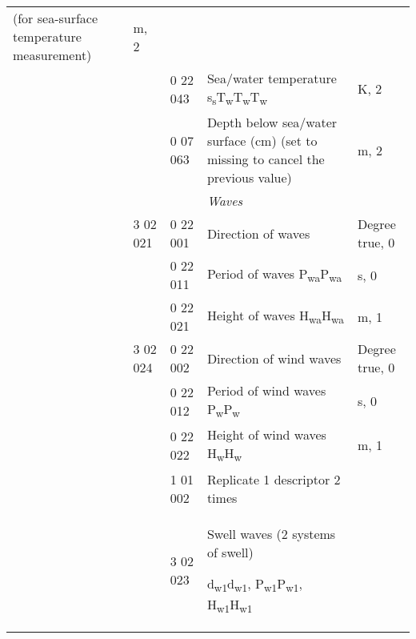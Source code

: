 \begin{longtable}[]{@{}lllll@{}}
\begin{minipage}[t]{0.17\columnwidth}
(for sea-surface temperature measurement)\strut
\end{minipage} & \begin{minipage}[t]{0.17\columnwidth}\raggedright
m, 2\strut
\end{minipage}\tabularnewline
& & 0 22 043 & Sea/water temperature s\textsubscript{s}T\textsubscript{w}T\textsubscript{w}T\textsubscript{w} & K, 2\tabularnewline
& & 0 07 063 & Depth below sea/water surface (cm) (set to missing to cancel the previous value) & m, 2\tabularnewline
& & & \emph{Waves} &\tabularnewline
& 3 02 021 & 0 22 001 & Direction of waves & Degree true, 0\tabularnewline
& & 0 22 011 & Period of waves P\textsubscript{wa}P\textsubscript{wa} & s, 0\tabularnewline
& & 0 22 021 & Height of waves H\textsubscript{wa}H\textsubscript{wa} & m, 1\tabularnewline
& 3 02 024 & 0 22 002 & Direction of wind waves & Degree true, 0\tabularnewline
& & 0 22 012 & Period of wind waves P\textsubscript{w}P\textsubscript{w} & s, 0\tabularnewline
& & 0 22 022 & Height of wind waves H\textsubscript{w}H\textsubscript{w} & m, 1\tabularnewline
& & 1 01 002 & Replicate 1 descriptor 2 times &\tabularnewline
\begin{minipage}[t]{0.17\columnwidth}\raggedright
\strut
\end{minipage} & \begin{minipage}[t]{0.17\columnwidth}\raggedright
\strut
\end{minipage} & \begin{minipage}[t]{0.17\columnwidth}\raggedright
3 02 023\strut
\end{minipage} & \begin{minipage}[t]{0.17\columnwidth}\raggedright
Swell waves (2 systems of swell)

d\textsubscript{w1}d\textsubscript{w1}, P\textsubscript{w1}P\textsubscript{w1}, H\textsubscript{w1}H\textsubscript{w1}


\end{minipage}
\end{longtable}
